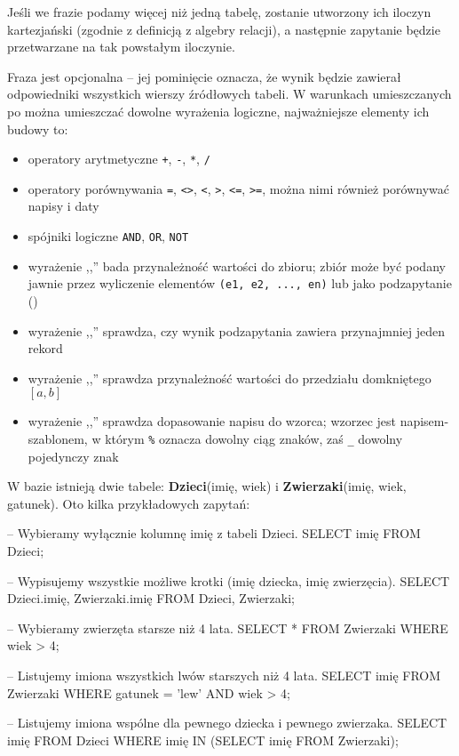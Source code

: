 Jeśli we frazie  podamy więcej niż jedną tabelę, zostanie utworzony ich iloczyn kartezjański (zgodnie z definicją z algebry relacji), a następnie zapytanie będzie przetwarzane na tak powstałym iloczynie.

Fraza  jest opcjonalna -- jej pominięcie oznacza, że wynik będzie zawierał odpowiedniki wszystkich wierszy źródłowych tabeli. W warunkach umieszczanych po  można umieszczać dowolne wyrażenia logiczne, najważniejsze elementy ich budowy to:
\begin{itemize}
    \item operatory arytmetyczne \texttt{+}, \texttt{-}, \texttt{*}, \texttt{/}
    \item operatory porównywania \texttt{=}, \texttt{<>}, \texttt{<}, \texttt{>}, \texttt{<=}, \texttt{>=}, można nimi również porównywać napisy i daty
    \item spójniki logiczne \texttt{AND}, \texttt{OR}, \texttt{NOT}
    \item wyrażenie ,,'' bada przynależność wartości do zbioru; zbiór może być podany jawnie przez wyliczenie elementów \texttt{(e1, e2, ..., en)} lub jako podzapytanie ()
    \item wyrażenie ,,'' sprawdza, czy wynik podzapytania zawiera przynajmniej jeden rekord
    \item wyrażenie ,,'' sprawdza przynależność wartości do przedziału domkniętego $[a, b]$
    \item wyrażenie ,,'' sprawdza dopasowanie napisu do wzorca; wzorzec jest napisem-szablonem, w którym \texttt{\%} oznacza dowolny ciąg znaków, zaś \texttt{\_} dowolny pojedynczy znak
\end{itemize}

\begin{example}
    W bazie istnieją dwie tabele: \textbf{Dzieci}(imię, wiek) i \textbf{Zwierzaki}(imię, wiek, gatunek). Oto kilka przykładowych zapytań:
    \begin{sql} 
        -- Wybieramy wyłącznie kolumnę imię z tabeli Dzieci.
        SELECT imię FROM Dzieci;

        -- Wypisujemy wszystkie możliwe krotki (imię dziecka, imię zwierzęcia).
        SELECT Dzieci.imię, Zwierzaki.imię
        FROM Dzieci, Zwierzaki;
        
        -- Wybieramy zwierzęta starsze niż 4 lata.
        SELECT *
        FROM Zwierzaki
        WHERE wiek > 4;

        -- Listujemy imiona wszystkich lwów starszych niż 4 lata.
        SELECT imię
        FROM Zwierzaki
        WHERE gatunek = 'lew' AND wiek > 4;

        -- Listujemy imiona wspólne dla pewnego dziecka i pewnego zwierzaka.
        SELECT imię
        FROM Dzieci
        WHERE imię IN (SELECT imię FROM Zwierzaki);
    \end{sql} 
\end{example}

